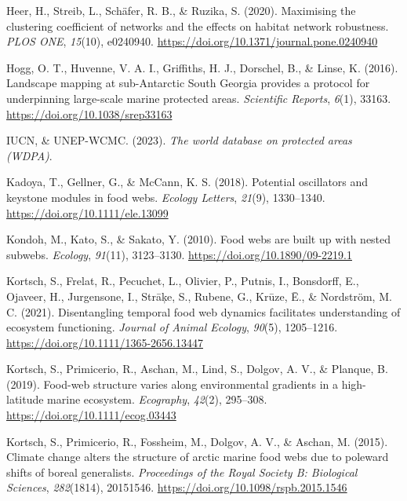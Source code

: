 \documentclass[preprint, 3p,
authoryear]{elsarticle} %
\newlength{\cslhangindent}
\newlength{\cslentryspacingunit} %
\newenvironment{CSLReferences}[2] %
 {%
  \setlength{\parindent}{0pt}
  \ifodd #1
  \let\oldpar\par
  \def\par{\hangindent=\cslhangindent\oldpar}
  \fi
  \setlength{\parskip}{#2\cslentryspacingunit}
 }%
 {}
\begin{document}
\begin{CSLReferences}{1}{0}
\leavevmode{}%
Heer, H., Streib, L., Schäfer, R. B., \& Ruzika, S. (2020). Maximising
the clustering coefficient of networks and the effects on habitat
network robustness. \emph{PLOS ONE}, \emph{15}(10), e0240940.
\url{https://doi.org/10.1371/journal.pone.0240940}

\leavevmode{}%
Hogg, O. T., Huvenne, V. A. I., Griffiths, H. J., Dorschel, B., \&
Linse, K. (2016). Landscape mapping at sub-{Antarctic South Georgia}
provides a protocol for underpinning large-scale marine protected areas.
\emph{Scientific Reports}, \emph{6}(1), 33163.
\url{https://doi.org/10.1038/srep33163}

\leavevmode{}%
IUCN, \& UNEP-WCMC. (2023). \emph{The world database on protected areas
({WDPA})}.

\leavevmode{}%
Kadoya, T., Gellner, G., \& McCann, K. S. (2018). Potential oscillators
and keystone modules in food webs. \emph{Ecology Letters}, \emph{21}(9),
1330--1340. \url{https://doi.org/10.1111/ele.13099}

\leavevmode{}%
Kondoh, M., Kato, S., \& Sakato, Y. (2010). Food webs are built up with
nested subwebs. \emph{Ecology}, \emph{91}(11), 3123--3130.
\url{https://doi.org/10.1890/09-2219.1}

\leavevmode{}%
Kortsch, S., Frelat, R., Pecuchet, L., Olivier, P., Putnis, I.,
Bonsdorff, E., Ojaveer, H., Jurgensone, I., Strāķe, S., Rubene, G.,
Krūze, Ē., \& Nordström, M. C. (2021). Disentangling temporal food web
dynamics facilitates understanding of ecosystem functioning.
\emph{Journal of Animal Ecology}, \emph{90}(5), 1205--1216.
\url{https://doi.org/10.1111/1365-2656.13447}

\leavevmode{}%
Kortsch, S., Primicerio, R., Aschan, M., Lind, S., Dolgov, A. V., \&
Planque, B. (2019). Food-web structure varies along environmental
gradients in a high-latitude marine ecosystem. \emph{Ecography},
\emph{42}(2), 295--308. \url{https://doi.org/10.1111/ecog.03443}

\leavevmode{}%
Kortsch, S., Primicerio, R., Fossheim, M., Dolgov, A. V., \& Aschan, M.
(2015). Climate change alters the structure of arctic marine food webs
due to poleward shifts of boreal generalists. \emph{Proceedings of the
Royal Society B: Biological Sciences}, \emph{282}(1814), 20151546.
\url{https://doi.org/10.1098/rspb.2015.1546}


\end{CSLReferences}
\end{document}
